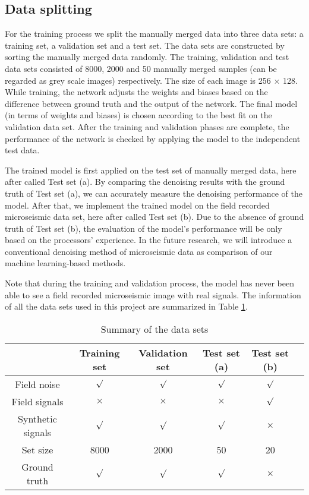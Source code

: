 \documentclass[a4paper]{article}
\begin{document}
\subsection{Data splitting}

For the training process we split the manually merged data into three data sets: a training set, a validation set and a test set. The data sets are constructed by sorting the manually merged data randomly. The training, validation and test data sets consisted of 8000, 2000 and 50 manually merged samples (can be regarded as grey scale images) respectively. The size of each image is 256 $\times$ 128. While training, the network adjusts the weights and biases based on the difference between ground truth and the output of the network. The final model (in terms of weights and biases) is chosen according to the best fit on the validation data set. After the training and validation phases are complete, the performance of the network is checked by applying the model to the independent test data. 

The trained model is first applied on the test set of manually merged data, here after called Test set (a). By comparing the denoising results with the ground truth of Test set (a), we can accurately measure the denoising performance of the model. After that, we implement the trained model on the field recorded microseismic data set, here after called Test set (b). Due to the absence of ground truth of Test set (b), the evaluation of the model's performance will be only based on the processors' experience. In the future research, we will introduce a conventional denoising method of microseismic data as comparison of our machine learning-based methods.

Note that during the training and validation process, the model has never been able to see a field recorded microseismic image with real signals. The information of all the data sets used in this project are summarized in Table \ref{table:dataset}.

\begin{table}[H]
	\caption{Summary of the data sets}
	\centering
	\begin{tabular}{|c|c|c|c|c|c|}
		\hline
		             & Training set& Validation set& Test set (a) & Test set (b) \\  [0.5ex]
		\hline 
		Field noise  &  $\surd$  & $\surd$         & $\surd$     & $\surd$       \\ 
		\hline 
		Field signals&   $\times$ & $\times$       & $\times$    & $\surd$       \\ 
		\hline 
	Synthetic signals& $\surd$  & $\surd$          & $\surd$     & $\times$      \\ 
		\hline 
		Set size     & 8000     &   2000           &   50        & 20            \\ 
		\hline  
		Ground truth & $\surd$  & $\surd$          & $\surd$     & $\times$      \\ 
		\hline 
	\end{tabular} 
    \label{table:dataset}
\end{table}	
\end{document}
